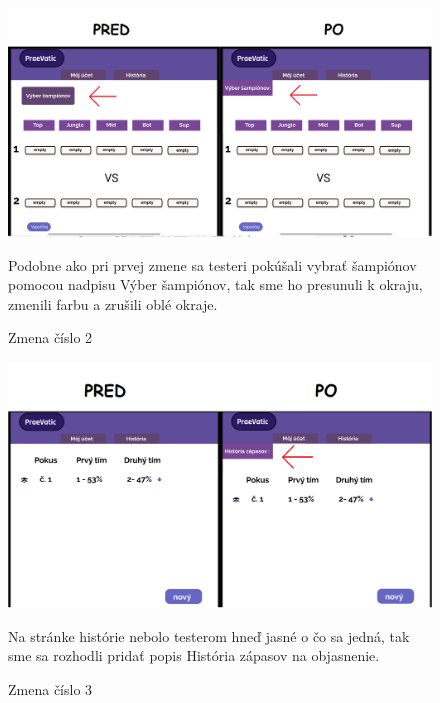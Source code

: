 \begin{figure}[h!]
	
	\includegraphics[width=.9\textwidth]{figures/2}
	
	\centering
	
	\caption{Zmena číslo 2\label{2}}
	Podobne ako pri prvej zmene sa testeri pokúšali vybrať šampiónov pomocou nadpisu Výber šampiónov, tak sme ho presunuli k okraju, zmenili farbu a zrušili oblé okraje.
	
\end{figure}



\begin{figure}[h!]
	
	\includegraphics[width=.9\textwidth]{figures/3}
	
	\centering
	
	\caption{ Zmena číslo 3 \label{3}}
	Na stránke histórie nebolo testerom hneď jasné o čo sa jedná, tak sme sa rozhodli pridať popis História zápasov na objasnenie.
	
\end{figure}



